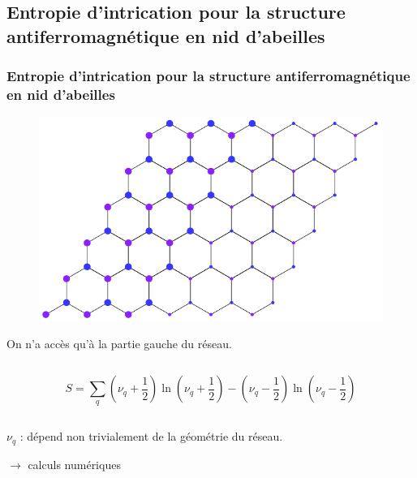 \documentclass[10pt,a4paper]{beamer}
\newcommand{\1}{\ensuremath{\ket{\om_1\bom_1}}\xspace}
\newcommand{\2}{\ensuremath{\ket{\om_2\bom_2}}\xspace}
\begin{document}
\subsection{Entropie d'intrication pour la structure antiferromagnétique en nid d'abeilles}
\begin{frame}
\frametitle{Entropie d'intrication pour la structure antiferromagnétique en nid d'abeilles}
\begin{figure}[htp]
\centering
\includegraphics[scale=0.50]{vector_img/systeme_calculs.pdf}
\end{figure}
On n'a accès qu'à la partie gauche du réseau.

\begin{columns}
  \begin{column}{12cm}
  \begin{alertblock}{}
  	\begin{equation}
	S=\sum_{q} \left(\nu_q+\frac{1}{2}\right)\ln \left(\nu_q+\frac{1}{2}\right)-\left(\nu_q-\frac{1}{2}\right)\ln \left(\nu_q-\frac{1}{2}\right)
	\end{equation}
  \end{alertblock}
  \end{column}
\end{columns}
$\nu_q$ : dépend non trivialement de la géométrie du réseau.

$\rightarrow$ calculs numériques 
\end{frame}
\end{document}
